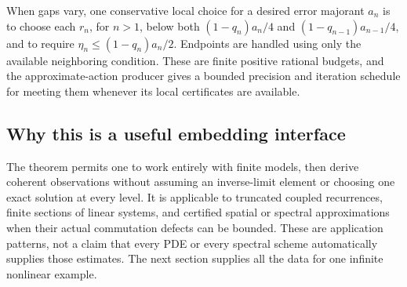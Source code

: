 When gaps vary, one conservative local choice for a desired error
majorant \(a_n\) is to choose each \(r_n\), for \(n>1\), below
both \((1-q_n)a_n/4\) and \((1-q_{n-1})a_{n-1}/4\), and to
require \(\eta_n\le(1-q_n)a_n/2\). Endpoints are handled using
only the available neighboring condition. These are finite positive
rational budgets, and the approximate-action producer gives a bounded
precision and iteration schedule for meeting them whenever its
local certificates are available.

\subsection{Why this is a useful embedding interface}

The theorem permits one to work entirely with finite models, then
derive coherent observations without assuming an inverse-limit element
or choosing one exact solution at every level. It is applicable to
truncated coupled recurrences, finite sections of linear systems, and
certified spatial or spectral approximations when their actual
commutation defects can be bounded. These are application patterns,
not a claim that every PDE or every spectral scheme automatically
supplies those estimates. The next section supplies all the data for
one infinite nonlinear example.
